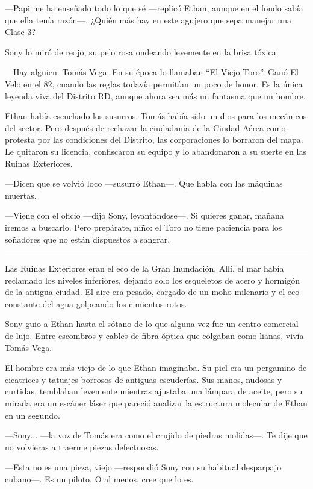 \documentclass[12pt,a4paper]{book}
\begin{document}
---Papi me ha enseñado todo lo que sé ---replicó Ethan, aunque en el fondo sabía que ella tenía razón---. ¿Quién más hay en este agujero que sepa manejar una Clase 3?

Sony lo miró de reojo, su pelo rosa ondeando levemente en la brisa tóxica.

---Hay alguien. Tomás Vega. En su época lo llamaban ``El Viejo Toro''. Ganó El Velo en el 82, cuando las reglas todavía permitían un poco de honor. Es la única leyenda viva del Distrito RD, aunque ahora sea más un fantasma que un hombre.

Ethan había escuchado los susurros. Tomás había sido un dios para los mecánicos del sector. Pero después de rechazar la ciudadanía de la Ciudad Aérea como protesta por las condiciones del Distrito, las corporaciones lo borraron del mapa. Le quitaron su licencia, confiscaron su equipo y lo abandonaron a su suerte en las Ruinas Exteriores.

---Dicen que se volvió loco ---susurró Ethan---. Que habla con las máquinas muertas.

---Viene con el oficio ---dijo Sony, levantándose---. Si quieres ganar, mañana iremos a buscarlo. Pero prepárate, niño: el Toro no tiene paciencia para los soñadores que no están dispuestos a sangrar.

\bigskip
\noindent\rule{\textwidth}{0.4pt}
\bigskip

Las Ruinas Exteriores eran el eco de la Gran Inundación. Allí, el mar había reclamado los niveles inferiores, dejando solo los esqueletos de acero y hormigón de la antigua ciudad. El aire era pesado, cargado de un moho milenario y el eco constante del agua golpeando los cimientos rotos.

Sony guio a Ethan hasta el sótano de lo que alguna vez fue un centro comercial de lujo. Entre escombros y cables de fibra óptica que colgaban como lianas, vivía Tomás Vega.

El hombre era más viejo de lo que Ethan imaginaba. Su piel era un pergamino de cicatrices y tatuajes borrosos de antiguas escuderías. Sus manos, nudosas y curtidas, temblaban levemente mientras ajustaba una lámpara de aceite, pero su mirada era un escáner láser que pareció analizar la estructura molecular de Ethan en un segundo.

---Sony... ---la voz de Tomás era como el crujido de piedras molidas---. Te dije que no volvieras a traerme piezas defectuosas.

---Esta no es una pieza, viejo ---respondió Sony con su habitual desparpajo cubano---. Es un piloto. O al menos, cree que lo es.
\end{document}
